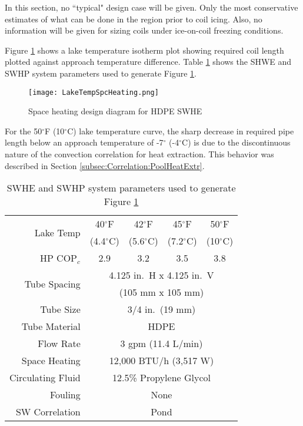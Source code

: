 In this section, no ``typical" design case will be given. Only the most conservative estimates of what can be done in the region prior to coil icing. Also, no information will be given for sizing coils under ice-on-coil freezing conditions.

Figure \ref{fig:DesignTools:SpcHeating:LakeTempSpcHeating} shows a lake temperature isotherm plot showing required coil length plotted against approach temperature difference. Table \ref{tab:DesignTools:SpcHeating:LakeTempSpcHeatingParams} shows the SHWE and SWHP system parameters used to generate Figure \ref{fig:DesignTools:SpcHeating:LakeTempSpcHeating}.

	\begin{figure}
		\centering
		\texttt{[image: LakeTempSpcHeating.png]}
		\caption{Space heating design diagram for HDPE SWHE}
		\label{fig:DesignTools:SpcHeating:LakeTempSpcHeating}
	\end{figure}
	
For the 50$^\circ$F (10$^\circ$C) lake temperature curve, the sharp decrease in required pipe length below an approach temperature of -7$^\circ$ (-4$^\circ$C) is due to the discontinuous nature of the convection correlation for heat extraction. This behavior was described in Section \ref{subsec:Correlation:PoolHeatExtr}.

	\begin{table}[h]
		\centering
		\caption{SWHE and SWHP system parameters used to generate Figure \ref{fig:DesignTools:SpcHeating:LakeTempSpcHeating}}
		\label{tab:DesignTools:SpcHeating:LakeTempSpcHeatingParams}
		\begin{tabular}{r c c c c}
		\hline
		\multirow{2}{*}{Lake Temp} & 40$^\circ$F & 42$^\circ$F & 45$^\circ$F & 50$^\circ$F \\
		& (4.4$^\circ$C) & (5.6$^\circ$C) & (7.2$^\circ$C) & (10$^\circ$C) \\
		\hline\hline
		HP $\mbox{COP}_c$ & 2.9 & 3.2 & 3.5 & 3.8 \\
		\hline
		\multirow{2}{*}{Tube Spacing} & \multicolumn{4}{c}{4.125 in.\ H x 4.125 in.\ V} \\
		& \multicolumn{4}{c}{(105 mm x 105 mm)} \\
		\hline
		Tube Size & \multicolumn{4}{c}{3/4 in.\ (19 mm)} \\
		\hline
		Tube Material & \multicolumn{4}{c}{HDPE} \\
		\hline
		Flow Rate & \multicolumn{4}{c}{3 gpm (11.4 L/min)} \\
		\hline
		Space Heating & \multicolumn{4}{c}{12,000 BTU/h (3,517 W)} \\
		\hline
		Circulating Fluid & \multicolumn{4}{c}{12.5\% Propylene Glycol} \\
		\hline
		Fouling & \multicolumn{4}{c}{None} \\
		\hline
		SW Correlation & \multicolumn{4}{c}{Pond} \\
		\hline
		\end{tabular}
	\end{table}
	

